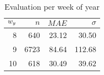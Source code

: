 \begin{table}
  \centering
  \caption{Evaluation per week of year}
  \label{tab:eval_woy}
  \begin{tabular}{rrrr}
  \(w_y\) & \(n\) & \(MAE\) & \(\sigma\) \\
  \hline 
   8       &  640  & 23.12   &  30.50 \\
   9       & 6723  & 84.64   & 112.68 \\
  10       &  618  & 30.49   &  39.62 \\
  \hline
  \end{tabular}
\end{table}

